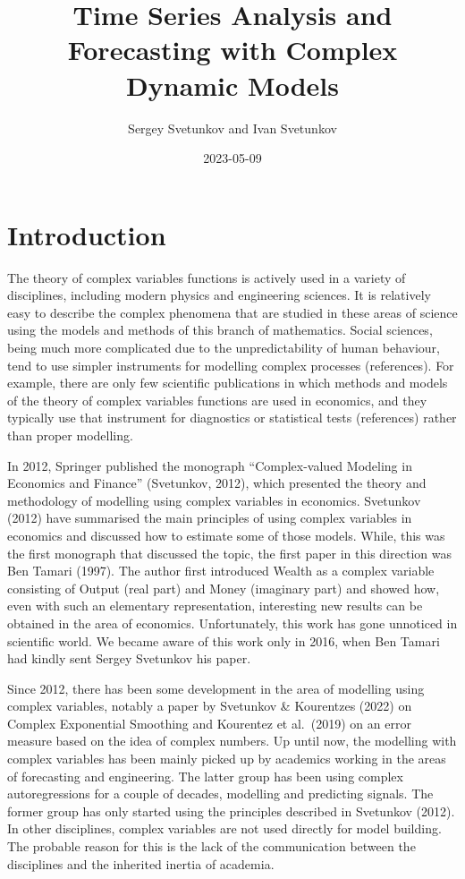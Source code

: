 \documentclass[
]{book}
\title{Time Series Analysis and Forecasting with Complex Dynamic Models}
\author{Sergey Svetunkov and Ivan Svetunkov}
\date{2023-05-09}
\begin{document}
\maketitle

{
\setcounter{tocdepth}{1}
\tableofcontents
}
\hypertarget{introduction}{%
\chapter*{Introduction}\label{introduction}}

The theory of complex variables functions is actively used in a variety of disciplines, including modern physics and engineering sciences. It is relatively easy to describe the complex phenomena that are studied in these areas of science using the models and methods of this branch of mathematics. Social sciences, being much more complicated due to the unpredictability of human behaviour, tend to use simpler instruments for modelling complex processes (references). For example, there are only few scientific publications in which methods and models of the theory of complex variables functions are used in economics, and they typically use that instrument for diagnostics or statistical tests (references) rather than proper modelling.

In 2012, Springer published the monograph ``Complex-valued Modeling in Economics and Finance'' (Svetunkov, 2012), which presented the theory and methodology of modelling using complex variables in economics. Svetunkov (2012) have summarised the main principles of using complex variables in economics and discussed how to estimate some of those models. While, this was the first monograph that discussed the topic, the first paper in this direction was Ben Tamari (1997). The author first introduced Wealth as a complex variable consisting of Output (real part) and Money (imaginary part) and showed how, even with such an elementary representation, interesting new results can be obtained in the area of economics. Unfortunately, this work has gone unnoticed in scientific world. We became aware of this work only in 2016, when Ben Tamari had kindly sent Sergey Svetunkov his paper.

Since 2012, there has been some development in the area of modelling using complex variables, notably a paper by Svetunkov \& Kourentzes (2022) on Complex Exponential Smoothing and Kourentez et al.~(2019) on an error measure based on the idea of complex numbers. Up until now, the modelling with complex variables has been mainly picked up by academics working in the areas of forecasting and engineering. The latter group has been using complex autoregressions for a couple of decades, modelling and predicting signals. The former group has only started using the principles described in Svetunkov (2012). In other disciplines, complex variables are not used directly for model building. The probable reason for this is the lack of the communication between the disciplines and the inherited inertia of academia.
\end{document}
